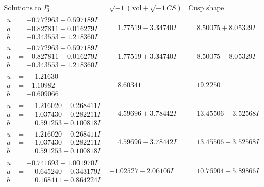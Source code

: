 \documentclass[1p]{elsarticle_modified}
\theoremstyle{definition}
\newcommand{\I}{\sqrt{-1}}
\begin{document}
$$\begin{array}{c|c|c}  
\text{Solutions to }I^u_{3}& \I (\text{vol} + \sqrt{-1}CS) & \text{Cusp shape}\\
 \hline 
\begin{aligned}
u &= -0.772963 + 0.597189 I \\
a &= -0.827811 - 0.016279 I \\
b &= -0.343553 - 1.218360 I\end{aligned}
 & \phantom{-}1.77519 - 3.34740 I & \phantom{-}8.50075 + 8.05329 I \\ \hline\begin{aligned}
u &= -0.772963 - 0.597189 I \\
a &= -0.827811 + 0.016279 I \\
b &= -0.343553 + 1.218360 I\end{aligned}
 & \phantom{-}1.77519 + 3.34740 I & \phantom{-}8.50075 - 8.05329 I \\ \hline\begin{aligned}
u &= \phantom{-}1.21630\phantom{ +0.000000I} \\
a &= -1.10982\phantom{ +0.000000I} \\
b &= -0.609066\phantom{ +0.000000I}\end{aligned}
 & \phantom{-}8.60341\phantom{ +0.000000I} & \phantom{-}19.2250\phantom{ +0.000000I} \\ \hline\begin{aligned}
u &= \phantom{-}1.216020 + 0.268411 I \\
a &= \phantom{-}1.037430 - 0.282211 I \\
b &= \phantom{-}0.591253 - 0.100818 I\end{aligned}
 & \phantom{-}4.59696 + 3.78442 I & \phantom{-}13.45506 - 3.52568 I \\ \hline\begin{aligned}
u &= \phantom{-}1.216020 - 0.268411 I \\
a &= \phantom{-}1.037430 + 0.282211 I \\
b &= \phantom{-}0.591253 + 0.100818 I\end{aligned}
 & \phantom{-}4.59696 - 3.78442 I & \phantom{-}13.45506 + 3.52568 I \\ \hline\begin{aligned}
u &= -0.741693 + 1.001970 I \\
a &= \phantom{-}0.645240 + 0.343179 I \\
b &= \phantom{-}0.168411 + 0.864224 I\end{aligned}
 & -1.02527 - 2.06106 I & \phantom{-}10.76904 + 5.89866 I \\ \hline\begin{aligned}

\end{aligned}
\end{array}$$
\end{document}
